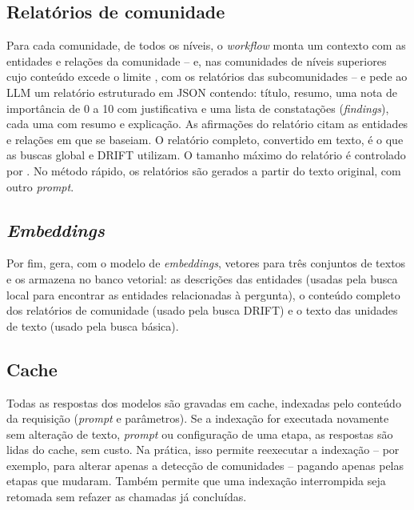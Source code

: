 \subsection{Relatórios de comunidade}
\label{sec-graphrag-indexacao-relatorios}

Para cada comunidade, de todos os níveis, o \textit{workflow}  monta um contexto com as entidades e relações da comunidade -- e, nas comunidades de níveis superiores cujo conteúdo excede o limite , com os relatórios das subcomunidades -- e pede ao LLM um relatório estruturado em JSON contendo: título, resumo, uma nota de importância de 0 a 10 com justificativa e uma lista de constatações (\textit{findings}), cada uma com resumo e explicação. As afirmações do relatório citam as entidades e relações em que se baseiam. O relatório completo, convertido em texto, é o que as buscas global e DRIFT utilizam. O tamanho máximo do relatório é controlado por . No método rápido, os relatórios são gerados a partir do texto original, com outro \textit{prompt}.

\subsection{\textit{Embeddings}}
\label{sec-graphrag-indexacao-embeddings}

Por fim,  gera, com o modelo de \textit{embeddings}, vetores para três conjuntos de textos e os armazena no banco vetorial: as descrições das entidades (usadas pela busca local para encontrar as entidades relacionadas à pergunta), o conteúdo completo dos relatórios de comunidade (usado pela busca DRIFT) e o texto das unidades de texto (usado pela busca básica).

\subsection{Cache}
\label{sec-graphrag-indexacao-cache}

Todas as respostas dos modelos são gravadas em cache, indexadas pelo conteúdo da requisição (\textit{prompt} e parâmetros). Se a indexação for executada novamente sem alteração de texto, \textit{prompt} ou configuração de uma etapa, as respostas são lidas do cache, sem custo. Na prática, isso permite reexecutar a indexação -- por exemplo, para alterar apenas a detecção de comunidades -- pagando apenas pelas etapas que mudaram. Também permite que uma indexação interrompida seja retomada sem refazer as chamadas já concluídas.

